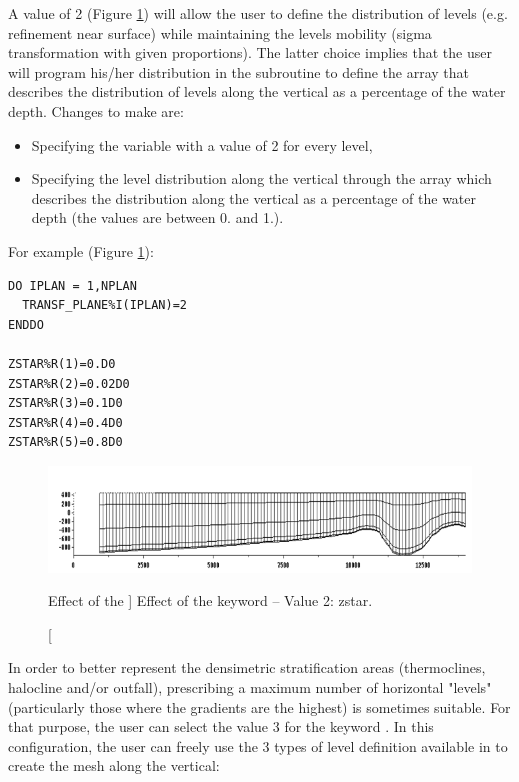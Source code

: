 A value of 2 (Figure \ref{fig:mesh_transf2}) will allow the user to define the
distribution of levels (e.g. refinement near surface) while maintaining the
levels mobility (sigma transformation with given proportions). The latter
choice implies that the user will program his/her distribution in the
 subroutine to define the  array
that describes
the distribution of levels along the vertical as a percentage of the water depth.
Changes to make are:

\begin{itemize}
\item Specifying the variable  with a value of 2
for every level,

\item Specifying the level distribution along the vertical through the array
 which describes the distribution along the vertical as a
percentage of the water depth (the values are between 0. and 1.).
\end{itemize}

For example (Figure \ref{fig:mesh_transf2}):

\begin{lstlisting}[language=TelFortran]
DO IPLAN = 1,NPLAN
  TRANSF_PLANE%I(IPLAN)=2
ENDDO

ZSTAR%R(1)=0.D0
ZSTAR%R(2)=0.02D0
ZSTAR%R(3)=0.1D0
ZSTAR%R(4)=0.4D0
ZSTAR%R(5)=0.8D0

\end{lstlisting}

\begin{figure}[H]%
\begin{center}
%
  \includegraphics[width=\textwidth]{./graphics/mesh_transformation2}
%
\end{center}
\caption
[Effect of the ]
{Effect of the  keyword -- Value 2: zstar.}
\label{fig:mesh_transf2}
\end{figure}

In order to better represent the densimetric stratification areas
(thermoclines, halocline and/or outfall), prescribing a maximum number of
horizontal "levels" (particularly those where the gradients are the highest) is
sometimes suitable. For that purpose, the user can select the value 3 for the
keyword . In this configuration, the user can
freely use the 3 types of level definition available in  to create
the mesh along the vertical:

